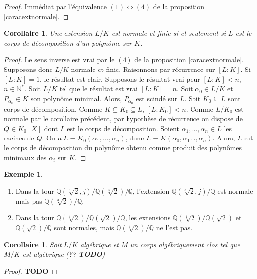 \documentclass{article}
\newcommand{\N}{\mathbb{N}}
\newcommand{\Q}{\mathbb{Q}}
\newcommand{\todo}{\textbf{TODO}}
\theoremstyle{plain}
\newtheorem{corollary}[theorem]{Corollaire}
\theoremstyle{definition}
\newtheorem{example}[theorem]{Exemple}
\theoremstyle{remark}
\begin{document}
\begin{proof}
    Immédiat par l'équivalence $(1) \iff (4)$ de la proposition \ref{caracextnormale}.
\end{proof}

\begin{corollary}
    Une extension $L/K$ est normale et finie si et seulement si $L$ est le corps de décomposition d'un polynôme sur $K$.
\end{corollary}

\begin{proof}
    Le sens inverse est vrai par le $(4)$ de la proposition \ref{caracextnormale}. Supposons donc $L/K$ normale et finie. Raisonnons par récurrence sur $[L : K]$. Si $[L : K] = 1$, le résultat est clair. Supposons le résultat vrai pour $[L : K] < n$, $n \in \N^*$. Soit $L/K$ tel que le résultat est vrai $[L : K] = n$. Soit $\alpha_0 \in L/K$ et $P_{\alpha_0} \in K$ son polynôme minimal. Alors, $P_{\alpha_0}$ est scindé sur $L$. Soit $K_0 \subseteq L$ sont corps de décomposition. Comme $K \subsetneq K_0 \subseteq L$, $[L : K_0] < n$. Comme $L/K_0$ est normale par le corollaire précédent, par hypothèse de récurrence on dispose de $Q \in K_0[X]$ dont $L$ est le corps de décomposition. Soient $\alpha_1,\dots,\alpha_n \in L$ les racines de $Q$. On a $L = K_0(\alpha_1,\dots,\alpha_n)$, donc $L = K(\alpha_0,\alpha_1\dots,\alpha_n)$. Alors, $L$ est le corps de décomposition du polynôme obtenu comme produit des polynômes minimaux des $\alpha_i$ sur $K$.
\end{proof}

\begin{example} \leavevmode
    \begin{enumerate}
        \item Dans la tour $\Q(\sqrt[3]{2},j)/\Q(\sqrt[3]{2})/\Q$, l'extension $\Q(\sqrt[3]{2},j)/\Q$ est normale mais pas $\Q(\sqrt[3]{2})/\Q$.
        \item Dans la tour $\Q(\sqrt[4]{2})/\Q(\sqrt{2})/\Q$, les extensions $\Q(\sqrt[4]{2})/\Q(\sqrt{2})$ et $\Q(\sqrt{2})/\Q$ sont normales, mais $\Q(\sqrt[4]{2})/\Q$ ne l'est pas.
    \end{enumerate}
\end{example}

\begin{corollary}
    Soit $L/K$ algébrique et $M$ un corps algébriquement clos tel que $M/K$ est algébrique (?? \todo)
\end{corollary}

\begin{proof}
    \todo
\end{proof}
\end{document}
